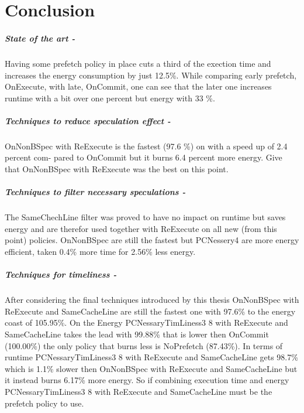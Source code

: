 \chapter{Conclusion}
\label{chap:conclusion}

\paragraph{State of the art -} Having some prefetch policy in place cuts a third of the exection time and increases the energy consumption by just 12.5\%. While comparing early prefetch, OnExecute, with late, OnCommit, one can see that the later one increases runtime with a bit over one percent but energy with 33 \%. 

\paragraph{Techniques to reduce speculation effect -} OnNonBSpec with ReExecute is the fastest (97.6 \%) on with a speed up of 2.4 percent com-
pared to OnCommit but it burns 6.4 percent more energy. Give that OnNonBSpec with ReExecute was the best on this point. 

\paragraph{Techniques to filter necessary speculations -} The SameChechLine filter was proved to have no impact on runtime but saves energy and are therefor used together with ReExecute on all new (from this point) policies. OnNonBSpec are still the fastest but PCNessery4 are more energy efficient, taken 0.4\% more time for 2.56\% less energy.

\paragraph{Techniques for timeliness -} After considering the final techniques introduced by this thesis OnNonBSpec with ReExecute and SameCacheLine are still the fastest one with 97.6\% to the energy coast of 105.95\%. On the Energy PCNessaryTimLiness3 8 with ReExecute and SameCacheLine takes the lead with 99.88\% that is lower then OnCommit (100.00\%) the only policy that burns less is NoPrefetch (87.43\%). In terms of runtime PCNessaryTimLiness3 8 with ReExecute and SameCacheLine gets 98.7\% which is 1.1\% slower then  OnNonBSpec with ReExecute and SameCacheLine  but it instead burns 6.17\% more energy. So if combining execution time and energy PCNessaryTimLiness3 8 with ReExecute and SameCacheLine must be the prefetch policy to use.

